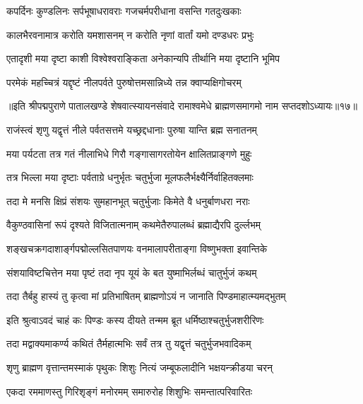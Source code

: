\twolineshloka
{कपर्दिनः कुण्डलिनः सर्पभूषाधरावराः}
{गजचर्मपरीधाना वसन्ति गतदुःखकाः}%

\twolineshloka
{कालभैरवनामात्र करोति यमशासनम्}
{न करोति नृणां वार्तां यमो दण्डधरः प्रभुः}%

\twolineshloka
{एतादृशी मया दृष्टा काशी विश्वेश्वराङ्किता}
{अनेकान्यपि तीर्थानि मया दृष्टानि भूमिप}%

\twolineshloka
{परमेकं महच्चित्रं यद्दृष्टं नीलपर्वते}
{पुरुषोत्तमसान्निध्ये तन्न क्वाप्यक्षिगोचरम्}%

{॥इति श्रीपद्मपुराणे पातालखण्डे शेषवात्स्यायनसंवादे रामाश्वमेधे ब्राह्मणसमागमो नाम सप्तदशोऽध्यायः॥१७॥}



\twolineshloka
{राजंस्त्वं शृणु यद्वृत्तं नीले पर्वतसत्तमे}
{यच्छ्रद्दधानाः पुरुषा यान्ति ब्रह्म सनातनम्}%

\twolineshloka
{मया पर्यटता तत्र गतं नीलाभिधे गिरौ}
{गङ्गासागरतोयेन क्षालितप्राङ्गणे मुहुः}%

\twolineshloka
{तत्र भिल्ला मया दृष्टाः पर्वताग्रे धनुर्भृतः}
{चतुर्भुजा मूलफलैर्भक्ष्यैर्निर्वाहितक्लमाः}%

\twolineshloka
{तदा मे मनसि क्षिप्रं संशयः सुमहानभूत्}
{चतुर्भुजाः किमेते वै धनुर्बाणधरा नराः}%

\twolineshloka
{वैकुण्ठवासिनां रूपं दृश्यते विजितात्मनाम्}
{कथमेतैरुपालब्धं ब्रह्माद्यैरपि दुर्ल्लभम्}%

\twolineshloka
{शङ्खचक्रगदाशार्ङ्गपद्मोल्लसितपाणयः}
{वनमालापरीताङ्गा विष्णुभक्ता इवान्तिके}%

\twolineshloka
{संशयाविष्टचित्तेन मया पृष्टं तदा नृप}
{यूयं के बत युष्माभिर्लब्धं चातुर्भुजं कथम्}%

\twolineshloka
{तदा तैर्बहु हास्यं तु कृत्वा मां प्रतिभाषितम्}
{ब्राह्मणोऽयं न जानाति पिण्डमाहात्म्यमद्भुतम्}%

\twolineshloka
{इति श्रुत्वाऽवदं चाहं कः पिण्डः कस्य दीयते}
{तन्मम ब्रूत धर्मिष्ठाश्चतुर्भुजशरीरिणः}%

\twolineshloka
{तदा मद्वाक्यमाकर्ण्य कथितं तैर्महात्मभिः}
{सर्वं तत्र तु यद्वृत्तं चतुर्भुजभवादिकम्}%


\twolineshloka
{शृणु ब्राह्मण वृत्तान्तमस्माकं पृथुकः शिशुः}
{नित्यं जम्बूफलादीनि भक्षयन्क्रीडया चरन्}%

\twolineshloka
{एकदा रममाणस्तु गिरिशृङ्गं मनोरमम्}
{समारुरोह शिशुभिः समन्तात्परिवारितः}%


